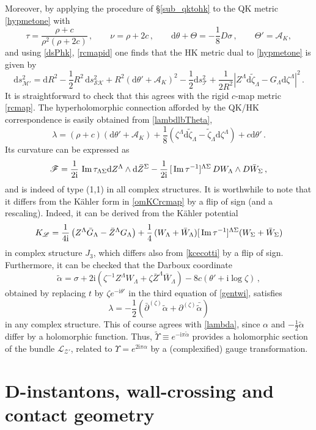 \documentclass[12pt,reqno]{article}
\numberwithin{equation}{section}
\renewcommand{\Im}{\imag}
\DeclareMathOperator{\imag}{Im}
\newcommand{\be}{\begin{equation}}
\newcommand{\ee}{\end{equation}}
\def\Im{\,{\rm Im}\, }
\def\({\left(}
\def\){\right)}
\def\bZ{\bar Z}
\def\bW{ \bar W}
\def\bG{\bar G}
\newcommand{\de}{\mathrm{d}}
\newcommand{\I}{\mathrm{i}}
\newcommand{\cA}{\mathcal{A}}
\newcommand{\cS}{\mathcal{S}}
\newcommand{\cK}{\mathcal{K}}
\newcommand{\cM}{\mathcal{M}}
\newcommand{\cT}{\mathcal{T}}
\newcommand{\cZ}{\mathcal{Z}}
\newcommand{\fb}{\mathscr{F}}
\newcommand{\lb}{\mathscr{L}}
\def\talp{\tilde\alpha}
\newcommand{\tzeta}{{\tilde\zeta}}
\newcommand{\kahler}{{K\"ahler}\xspace}
\def\varpiqk{t}
\def\varpihk{\zeta}
\def\sigp{{\theta}}
\def\phip{{\theta'}}
\def\pTheta{\Theta'}
\def\pcM{\cM'}
\def\pcZ{\cZ'}
\def\cff{\tau} %
\def\cfff{\nu} %
\def\rigZ{Z}
\def\brigZ{\bZ}
\def\conhyper{\lambda}
\def\pzeta{\partial^{(\varpihk)}}
\def\bpzeta{\bar\partial^{(\varpihk)}}
\numberwithin{equation}{section}
\begin{document}
Moreover, by applying the
procedure of \S\ref{sub_qktohk} to the  QK metric \eqref{hypmetone} with
\be
\cff=\frac{\rho+c}{\rho^2(\rho+2c)}\, ,
\qquad
\cfff=\rho+2c\, ,
\qquad
\de\sigp+\Theta=-\frac18 D\sigma\, ,
\qquad
\pTheta=\cA_K ,
\ee
and using  \eqref{dsPhk}, \eqref{rcmapid} one finds that the HK metric dual
to \eqref{hypmetone} is given by
\be
\de s^2_{\pcM} = \de R^2-\frac12 R^2 \, \de s^2_{\cS\cK}+ R^2(\de\phip+\cA_K)^2
-\frac12\de s^2_\cT
+ \frac{1}{2R^2} | Z^\Lambda \de \tzeta_\Lambda - G_{\Lambda} \de \zeta^\Lambda|^2\, .
\ee
It is straightforward to check that this  agrees with  the rigid $c$-map metric \eqref{rcmap}.
The hyperholomorphic connection afforded by the QK/HK
correspondence is easily obtained from \eqref{lambdlbTheta},
\be
\label{hyperholgen}
\conhyper =(\rho+c) (\de \phip+\cA_K)+
\frac18 \(\zeta^\Lambda \de \tzeta_\Lambda-\tzeta_\Lambda \de \zeta^\Lambda \)
+ c \de\phip\, .
\ee
Its curvature can be expressed as
\be
\label{hyperholrigid}
\fb = \frac{1}{2\I}\, \Im\tau_{\Lambda\Sigma} \de \rigZ^\Lambda \wedge \de \brigZ^\Sigma
-\frac{1}{2\I} \, [\Im\tau^{-1}]^{\Lambda \Sigma} \, DW_\Lambda \wedge D \bar W_\Sigma
 \, ,
\ee
and is indeed of type (1,1) in all complex structures. It is worthwhile to note
that it differs from  the \kahler form in \eqref{omKCrcmap} by a flip of sign (and a rescaling).
Indeed, it can be derived from the \kahler potential
\be
\label{kcecottih}
K_{\lb} = \frac{1}{4\I} \( \rigZ^\Lambda \bG_\Lambda- \brigZ^\Lambda G_\Lambda \)
+ \frac14\, (W_\Lambda + \bW_\Lambda) [\Im\tau^{-1}]^{\Lambda\Sigma}
(W_\Sigma + \bW_\Sigma)
\ee
in complex structure $J_3$, which differs also from \eqref{kcecotti} by a flip of sign.
Furthermore, it can be checked that the
Darboux coordinate
\be
\talp= \sigma +2\I \left( \varpihk^{-1} \rigZ^\Lambda W_\Lambda + \varpihk \bar \rigZ^\Lambda\bar
W_\Lambda \right) - 8  c\( \phip + \I \log \varpihk\) \, ,
\ee
obtained by replacing $\varpiqk$ by $\varpihk e^{-\I\phip}$ in the third
equation of \eqref{gentwi}, satisfies
\be
\conhyper = -\frac12 \(\bpzeta \talp + \pzeta \bar\talp\)
\ee
in any complex structure. This of course agrees with \eqref{lambda}, since
$\alpha$ and $-\frac12\talp$ differ by a holomorphic function. Thus,
$\tilde\Upsilon\equiv e^{-\I\pi\talp}$ provides
a holomorphic section of the bundle $\lb_{\pcZ}$, related to $\Upsilon=e^{2\I\pi\alpha}$
by a (complexified) gauge transformation.







\section{D-instantons, wall-crossing and contact geometry}
\label{contactwallcrossing}
\end{document}
